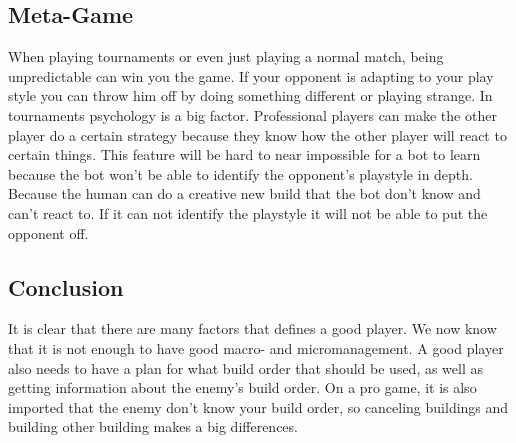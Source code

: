 \subsection{Meta-Game}		
		When playing tournaments or even just playing a normal match, being unpredictable can win you the game. 
		If your opponent is adapting to your play style you can throw him off by doing something different or playing strange.
		In tournaments psychology is a big factor. Professional players can make the other player do a certain strategy because they know 
		how the other player will react to certain things. This feature will be hard to near impossible for a bot to learn because the bot won't be able to 
		identify the opponent's playstyle in depth. Because the human can do a creative new build that the bot don't know and can't react to. 
		If it can not identify the playstyle it will not be able to put the opponent off.

\subsection{Conclusion}
	It is clear that there are many factors that defines a good player. We now know that it is not enough to have good macro- and micromanagement. A good player also needs to have a plan for what build order that
	should be used, as well as getting information about the enemy's build order. On a pro game, it is also imported that the enemy don't know your build order, so canceling buildings and building other building makes a big
	differences.   